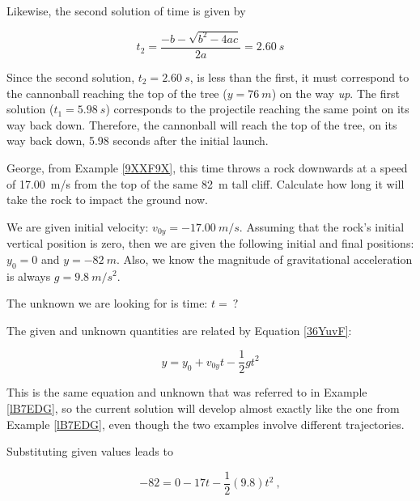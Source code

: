 \documentclass{article}
\begin{document}
Likewise, the second solution of time is given by

\begin{equation*}
    t_2 = \frac{-b - \sqrt{b^2 - 4ac}}{2a} = \SI{2.60}{s}
\end{equation*}

Since the second solution, $t_2 = \SI{2.60}{s}$, is less than the first, it must correspond to the cannonball reaching the top of the tree ($y=\SI{76}{m}$) on the way \textit{up}. The first solution ($t_1 = \SI{5.98}{s}$) corresponds to the projectile reaching the same point on its way back down. Therefore, the cannonball will reach the top of the tree, on its way back down, 5.98 seconds after the initial launch.

\endsolution


\begin{example} \label{pyn6Go}
    George, from Example \ref{9XXF9X}, this time throws a rock downwards at a speed of \SI{17.00}{m/s} from the top of the same \SI{82}{m} tall cliff. Calculate how long it will take the rock to impact the ground now.
\end{example}

\Solution We are given initial velocity: $v_{0y} = \SI{-17.00}{m/s}$. Assuming that the rock's initial vertical position is zero, then we are given the following initial and final positions: $y_0 = 0$ and $y = \SI{-82}{m}$. Also, we know the magnitude of gravitational acceleration is always $g = \SI{9.8}{m/s^2}$. 

\vspace{1em}

The unknown we are looking for is time: $t =\ ?$

\vspace{1em}

The given and unknown quantities are related by Equation \eqref{36YuvF}:

\begin{equation*}
    y = y_0 + v_{0y}t - \frac{1}{2}  g t^2
\end{equation*}

This is the same equation and unknown that was referred to in Example \ref{lB7EDG}, so the current solution will develop almost exactly like the one from Example \ref{lB7EDG}, even though the two examples involve different trajectories.


\vspace{1em}

Substituting given values leads to 

\begin{equation*}
    -82 =  0 - 17 t -\frac{1}{2}(9.8) t^2\ ,
\end{equation*}
\end{document}
